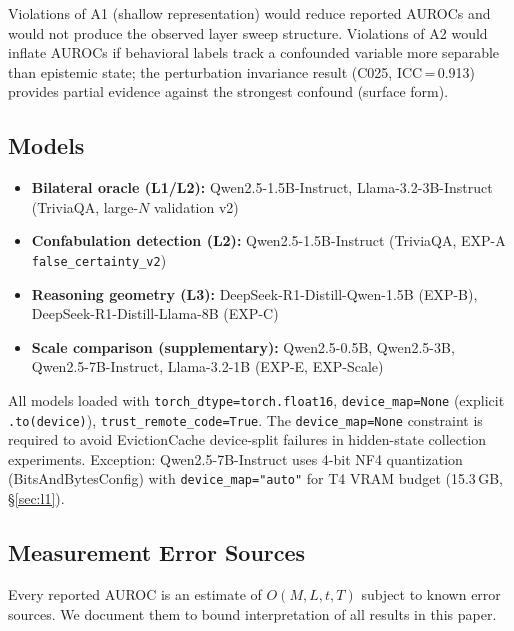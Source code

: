 \documentclass[11pt]{article}
\newcommand{\code}[1]{\texttt{\small #1}}
\begin{document}
Violations of A1 (shallow representation) would reduce reported AUROCs and
would not produce the observed layer sweep structure. Violations of A2 would
inflate AUROCs if behavioral labels track a confounded variable more separable
than epistemic state; the perturbation invariance result (C025, ICC\,=\,0.913)
provides partial evidence against the strongest confound (surface form).

\subsection{Models}

\begin{itemize}[leftmargin=2em]
\item \textbf{Bilateral oracle (L1/L2):} Qwen2.5-1.5B-Instruct, Llama-3.2-3B-Instruct
  (TriviaQA, large-$N$ validation v2)
\item \textbf{Confabulation detection (L2):} Qwen2.5-1.5B-Instruct
  (TriviaQA, EXP-A \texttt{false\_certainty\_v2})
\item \textbf{Reasoning geometry (L3):} DeepSeek-R1-Distill-Qwen-1.5B (EXP-B),
  DeepSeek-R1-Distill-Llama-8B (EXP-C)
\item \textbf{Scale comparison (supplementary):} Qwen2.5-0.5B, Qwen2.5-3B,
  Qwen2.5-7B-Instruct, Llama-3.2-1B (EXP-E, EXP-Scale)
\end{itemize}

All models loaded with \code{torch\_dtype=torch.float16},
\code{device\_map=None} (explicit \code{.to(device)}), \code{trust\_remote\_code=True}.
The \code{device\_map=None} constraint is required to avoid EvictionCache device-split
failures in hidden-state collection experiments. Exception: Qwen2.5-7B-Instruct uses
4-bit NF4 quantization (BitsAndBytesConfig) with \code{device\_map="auto"} for T4
VRAM budget (15.3\,GB, \S\ref{sec:l1}).

\subsection{Measurement Error Sources}
\label{sec:measurement_error}

Every reported AUROC is an estimate of $O(M,L,t,T)$ subject to known error sources.
We document them to bound interpretation of all results in this paper.
\end{document}
